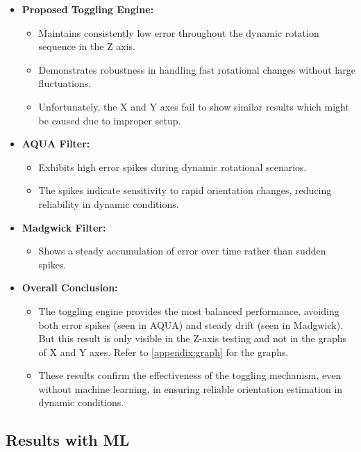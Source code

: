 \documentclass{iutbscthesis}
\begin{document}
\begin{itemize}
    \item \textbf{Proposed Toggling Engine:} 
    \begin{itemize}
        \item Maintains consistently low error throughout the dynamic rotation sequence in the Z axis.
        \item Demonstrates robustness in handling fast rotational changes without large fluctuations.
        \item Unfortunately, the X and Y axes fail to show similar results which might be caused due to improper setup.
    \end{itemize}

    \item \textbf{AQUA Filter:} 
    \begin{itemize}
        \item Exhibits high error spikes during dynamic rotational scenarios.
        \item The spikes indicate sensitivity to rapid orientation changes, reducing reliability in dynamic conditions.
    \end{itemize}

    \item \textbf{Madgwick Filter:} 
    \begin{itemize}
        \item Shows a steady accumulation of error over time rather than sudden spikes.
    \end{itemize}

    \item \textbf{Overall Conclusion:} 
    \begin{itemize}
        \item The toggling engine provides the most balanced performance, avoiding both error spikes (seen in AQUA) and steady drift (seen in Madgwick). But this result is only visible in the Z-axis testing and not in the graphs of X and Y axes. Refer to  \autoref{appendix:graph} for the graphs.
        \item These results confirm the effectiveness of the toggling mechanism, even without machine learning, in ensuring reliable orientation estimation in dynamic conditions.
    \end{itemize}
\end{itemize}

\subsection{Results with ML}
\end{document}
